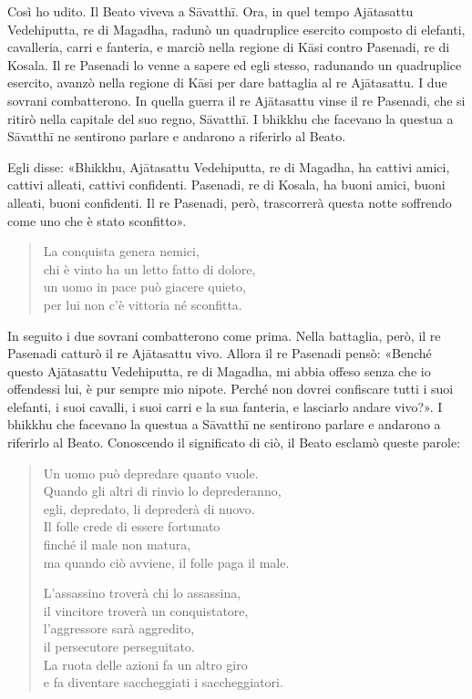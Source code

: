  Così ho udito. Il Beato viveva a Sāvatthī. Ora, in quel
tempo Ajātasattu Vedehiputta, re di Magadha, radunò un quadruplice esercito
composto di elefanti, cavalleria, carri e fanteria, e marciò nella regione di
Kāsi contro Pasenadi, re di Kosala. Il re Pasenadi lo venne a sapere ed egli
stesso, radunando un quadruplice esercito, avanzò nella regione di Kāsi per dare
battaglia al re Ajātasattu. I due sovrani combatterono. In quella guerra il re
Ajātasattu vinse il re Pasenadi, che si ritirò nella capitale del suo regno,
Sāvatthī. I bhikkhu che facevano la questua a Sāvatthī ne sentirono parlare e
andarono a riferirlo al Beato.

Egli disse: «Bhikkhu, Ajātasattu Vedehiputta, re di Magadha, ha cattivi amici,
cattivi alleati, cattivi confidenti. Pasenadi, re di Kosala, ha buoni amici,
buoni alleati, buoni confidenti. Il re Pasenadi, però, trascorrerà questa notte
soffrendo come uno che è stato sconfitto».

\begin{quote}
La conquista genera nemici, \\
chi è vinto ha un letto fatto di dolore, \\
un uomo in pace può giacere quieto, \\
per lui non c’è vittoria né sconfitta.
\end{quote}

In seguito i due sovrani combatterono come prima. Nella battaglia, però, il re
Pasenadi catturò il re Ajātasattu vivo. Allora il re Pasenadi pensò: «Benché
questo Ajātasattu Vedehiputta, re di Magadha, mi abbia offeso senza che io
offendessi lui, è pur sempre mio nipote. Perché non dovrei confiscare tutti i
suoi elefanti, i suoi cavalli, i suoi carri e la sua fanteria, e lasciarlo
andare vivo?». I bhikkhu che facevano la questua a Sāvatthī ne sentirono parlare
e andarono a riferirlo al Beato. Conoscendo il significato di ciò, il Beato
esclamò queste parole:

\begin{quote}
Un uomo può depredare quanto vuole. \\
Quando gli altri di rinvio lo deprederanno, \\
egli, depredato, li deprederà di nuovo. \\
Il folle crede di essere fortunato \\
finché il male non matura, \\
ma quando ciò avviene, il folle paga il male.

L’assassino troverà chi lo assassina, \\
il vincitore troverà un conquistatore, \\
l’aggressore sarà aggredito, \\
il persecutore perseguitato. \\
La ruota delle azioni fa un altro giro \\
e fa diventare saccheggiati i saccheggiatori.
\end{quote}


